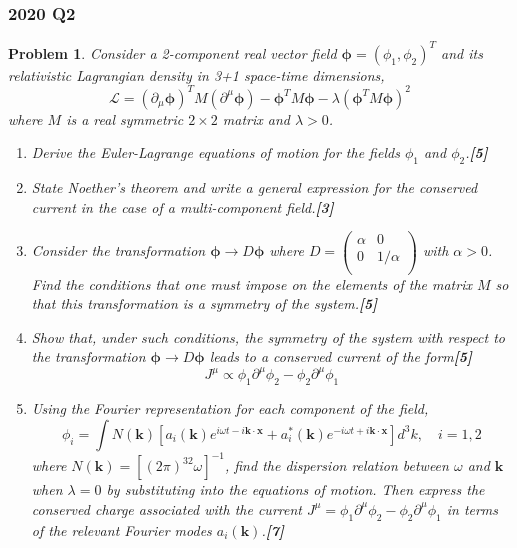 \documentclass[a4paper]{article}
\theoremstyle{new}
\newtheorem{qns}{Problem}[section]
\begin{document}
\subsubsection*{2020 Q2}
\begin{qns}
Consider a 2-component real vector field $\boldsymbol{\phi}=(\phi_1,\phi_2)^T$ and its relativistic Lagrangian density in 3+1 space-time dimensions,
$$\mathcal{L}=(\partial_\mu\boldsymbol{\phi})^TM(\partial^\mu\boldsymbol{\phi})-\boldsymbol{\phi}^TM\boldsymbol{\phi}-\lambda(\boldsymbol{\phi}^TM\boldsymbol{\phi})^2$$
where $M$ is a real symmetric $2\times 2$ matrix and $\lambda>0$.
\begin{enumerate}[label=(\alph*)]
\item  Derive the Euler-Lagrange equations of motion for the fields $\phi_1$ and $\phi_2$.\hfill\textbf{[5]}
\item  State Noether’s theorem and write a general expression for the conserved current in the case of a multi-component field.\hfill\textbf{[3]}
\item Consider the transformation $\boldsymbol{\phi}\rightarrow D\boldsymbol{\phi}$ where $D=\begin{pmatrix}\alpha&0\\0&1/\alpha\\\end{pmatrix}$ with $\alpha>0$. 
Find the conditions that one must impose on the elements of the matrix $M$ so that this transformation is a symmetry of the system.\hfill\textbf{[5]}
\item Show that, under such conditions, the symmetry of the system with respect to the transformation $\boldsymbol{\phi}\rightarrow D\boldsymbol{\phi}$ leads to a conserved current of the form\hfill\textbf{[5]}
$$J^\mu\propto\phi_1\partial^\mu\phi_2-\phi_2\partial^\mu\phi_1$$
\item  Using the Fourier representation for each component of the field,
$$\phi_i=\int N(\mathbf{k})[a_i(\mathbf{k})e^{i\omega t-i\mathbf{k}\cdot\mathbf{x}}+a_i^*(\mathbf{k})e^{-i\omega t+i\mathbf{k}\cdot\mathbf{x}}]d^3k,\quad i=1,2$$
where $N(\mathbf{k})=[(2\pi)^32\omega]^{-1}$, find the dispersion relation between $\omega$ and $\mathbf{k}$ when $\lambda=0$ by substituting into the equations of motion. Then express the conserved charge associated with the current $J^\mu=\phi_1\partial^\mu\phi_2-\phi_2\partial^\mu\phi_1$ in terms of the relevant Fourier modes $a_i(\mathbf{k})$.\hfill\textbf{[7]}
\end{enumerate}
\end{qns}
\end{document}
